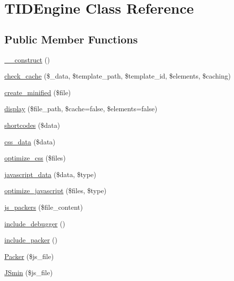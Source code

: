 \hypertarget{class_t_i_d_engine}{
\section{TIDEngine Class Reference}
\label{class_t_i_d_engine}
}
\subsection*{Public Member Functions}
\begin{DoxyCompactItemize}
\item 
\hyperlink{class_t_i_d_engine_a095c5d389db211932136b53f25f39685}{\_\-\_\-construct} ()
\item 
\hyperlink{class_t_i_d_engine_aa15b352bea711619b46255f3b216268d}{check\_\-cache} (\$\_\-data, \$template\_\-path, \$template\_\-id, \$elements, \$caching)
\item 
\hyperlink{class_t_i_d_engine_a07e07caf771b9d4171388e8258ddf4ef}{create\_\-minified} (\$file)
\item 
\hyperlink{class_t_i_d_engine_a3e3e3ea9bd1b6af66e25f2e559f45322}{display} (\$file\_\-path, \$cache=false, \$elements=false)
\item 
\hyperlink{class_t_i_d_engine_aea13c262e2b03850c680ec85a0011624}{shortcodes} (\$data)
\item 
\hyperlink{class_t_i_d_engine_a9032066a9c91083b137ffa57627d08fa}{css\_\-data} (\$data)
\item 
\hyperlink{class_t_i_d_engine_ae545113763a61b7d0d2066ed70773e61}{optimize\_\-css} (\$files)
\item 
\hyperlink{class_t_i_d_engine_a0b8ae084a5dc63ca4f6876ab2e43438d}{javascript\_\-data} (\$data, \$type)
\item 
\hyperlink{class_t_i_d_engine_ae3b381ddbd1de0b6053b2c82e60fd385}{optimize\_\-javascript} (\$files, \$type)
\item 
\hyperlink{class_t_i_d_engine_aa59f4a795d744620f3cc6b49f4a27992}{js\_\-packers} (\$file\_\-content)
\item 
\hyperlink{class_t_i_d_engine_a6c23057376e72bfa98f72e68cf39b787}{include\_\-debugger} ()
\item 
\hyperlink{class_t_i_d_engine_ad1d5d85a42a4f8a83ca6261448b5457c}{include\_\-packer} ()
\item 
\hyperlink{class_t_i_d_engine_a5a39f9ecf7304d4645246b5bcb916c1e}{Packer} (\$js\_\-file)
\item 
\hyperlink{class_t_i_d_engine_a33c1ef0d08960a1d75f4b55ecc7a844d}{JSmin} (\$js\_\-file)
\item 

\end{DoxyCompactItemize}
